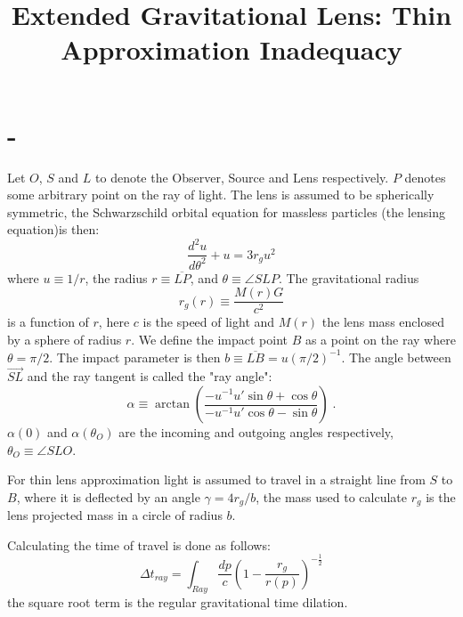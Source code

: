 \documentclass{article}
\begin{document}
\title{Extended Gravitational Lens: Thin Approximation Inadequacy}

\maketitle

\section{-}

Let $O$, $S$ and $L$ to denote the Observer, Source and Lens respectively. $P$ denotes some arbitrary point on the ray of light. The lens is assumed to be spherically symmetric, the Schwarzschild orbital equation for massless particles (the lensing equation)is then:
\begin{equation}
    \label{eq1}
    \frac{d^2u}{d\theta^2}+u=3r_gu^2
\end{equation}
where $u\equiv1/r$, the radius $r\equiv \overline{LP}$, and $\theta\equiv \angle SLP$.
The gravitational radius  
\begin{equation}
    \label{eq2}
    r_g(r) \equiv \frac{M(r)G}{c^2}
\end{equation}
is a function of $r$, here $c$ is the speed of light and $M(r)$ the lens mass enclosed by a sphere of radius $r$. We define the impact point $B$ as a point on the ray where $\theta=\pi/2$. The impact parameter is then $b \equiv \overline{LB}=u(\pi/2)^{-1}$. The angle between $\vec{SL}$ and the ray tangent is called the "ray angle":
\begin{equation}
    \label{eq3}
    \alpha \equiv \arctan \left( \frac{-u^{-1}u'\sin \theta + \cos \theta}{-u^{-1}u'\cos \theta - \sin \theta} \right) \;.
\end{equation}
$\alpha(0)$ and $\alpha(\theta_O)$ are the incoming and outgoing angles respectively, $\theta_O\equiv \angle SLO$.

For thin lens approximation light is assumed to travel in a straight line from $S$ to $B$, where it is deflected by an angle $\gamma=4r_g/b$, the mass used to calculate $r_g$ is the lens projected mass in a circle of radius $b$.

Calculating the time of travel is done as follows:
\begin{equation}
    \label{eq4}
    \Delta t_{ray} = \int_{Ray} \frac{dp}{c} \left( 1- \frac{r_g}{r(p)}\right)^{-\frac{1}{2}} 
\end{equation}
the square root term is the regular gravitational time dilation.
\end{document}
